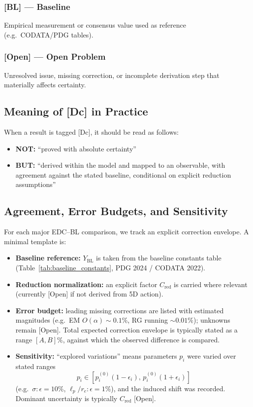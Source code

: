 \subsubsection*{[BL] --- Baseline}
Empirical measurement or consensus value used as reference (e.g.\ CODATA/PDG tables).

\subsubsection*{[Open] --- Open Problem}
Unresolved issue, missing correction, or incomplete derivation step that materially affects certainty.

\subsection*{Meaning of [Dc] in Practice}

When a result is tagged [Dc], it should be read as follows:

\begin{itemize}
\item \textbf{NOT:} ``proved with absolute certainty''
\item \textbf{BUT:} ``derived within the model and mapped to an observable, with agreement
against the stated baseline, conditional on explicit reduction assumptions''
\end{itemize}

\subsection*{Agreement, Error Budgets, and Sensitivity}

For each major EDC--BL comparison, we track an explicit correction envelope.
A minimal template is:

\begin{itemize}
\item \textbf{Baseline reference:} $Y_{\mathrm{BL}}$ is taken from the baseline constants table 
(Table~\ref{tab:baseline_constants}, PDG 2024 / CODATA 2022).

\item \textbf{Reduction normalization:} an explicit factor $C_{\mathrm{red}}$ is carried where 
relevant (currently [Open] if not derived from 5D action).

\item \textbf{Error budget:} leading missing corrections are listed with estimated magnitudes 
(e.g.\ EM $O(\alpha) \sim 0.1\%$, RG running $\sim 0.01\%$); unknowns remain [Open]. 
Total expected correction envelope is typically stated as a range $[A, B]\%$, against which 
the observed difference is compared.

\item \textbf{Sensitivity:} ``explored variations'' means parameters $p_i$ were varied over 
stated ranges
\[
p_i \in [p_i^{(0)}(1-\epsilon_i),\, p_i^{(0)}(1+\epsilon_i)]
\]
(e.g.\ $\sigma: \epsilon = 10\%$, $\ell_p/r_e: \epsilon = 1\%$), and the induced shift 
was recorded. Dominant uncertainty is typically $C_{\mathrm{red}}$ [Open].
\end{itemize}

